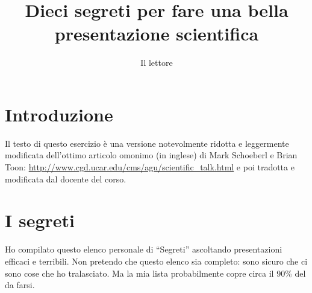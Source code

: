 \documentclass[12pt]{article}
\title{Dieci segreti per fare una bella presentazione scientifica}
\author{Il lettore}
\begin{document}
\maketitle

\section{Introduzione}

Il testo di questo esercizio \`{e} una versione notevolmente ridotta e leggermente modificata dell'ottimo articolo omonimo (in inglese) di Mark Schoeberl e Brian Toon:
\url{http://www.cgd.ucar.edu/cms/agu/scientific_talk.html} e poi tradotta e modificata dal docente del corso.

\section{I segreti}

Ho compilato questo elenco personale di ``Segreti'' ascoltando presentazioni efficaci e terribili. Non pretendo che questo elenco sia completo: sono sicuro che ci sono cose che ho tralasciato. Ma la mia lista probabilmente copre circa il 90\% del da farsi.
\end{document}
